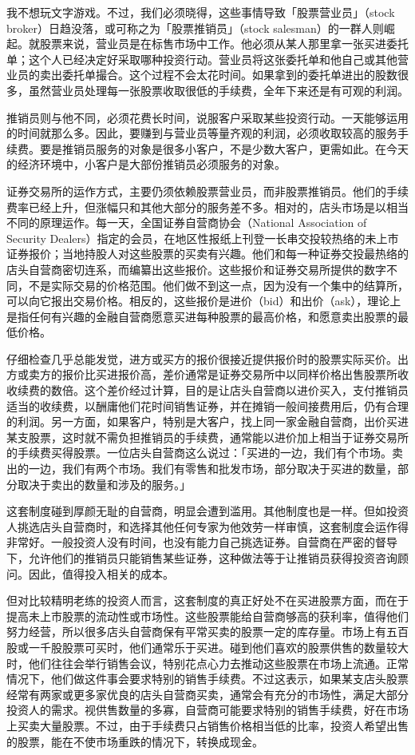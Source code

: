 \documentclass[UTF8,a4paper,zihao=-4,fontset = windows]{ctexart} %
\begin{document}
我不想玩文字游戏。不过，我们必须晓得，这些事情导致「股票营业员」（stock broker）日趋没落，或可称之为「股票推销员」（stock salesman）的一群人则崛起。就股票来说，营业员是在标售市场中工作。他必须从某人那里拿一张买进委托单；这个人已经决定好采取哪种投资行动。营业员将这张委托单和他自己或其他营业员的卖出委托单撮合。这个过程不会太花时间。如果拿到的委托单进出的股数很多，虽然营业员处理每一张股票收取很低的手续费，全年下来还是有可观的利润。

推销员则与他不同，必须花费长时间，说服客户采取某些投资行动。一天能够运用的时间就那么多。因此，要赚到与营业员等量齐观的利润，必须收取较高的服务手续费。要是推销员服务的对象是很多小客户，不是少数大客户，更需如此。在今天的经济环境中，小客户是大部份推销员必须服务的对象。

证券交易所的运作方式，主要仍须依赖股票营业员，而非股票推销员。他们的手续费率已经上升，但涨幅只和其他大部分的服务差不多。相对的，店头市场是以相当不同的原理运作。每一天，全国证券自营商协会（National Association of Security Dealers）指定的会员，在地区性报纸上刊登一长串交投较热络的未上市证券报价；当地持股人对这些股票的买卖有兴趣。他们和每一种证券交投最热络的店头自营商密切连系，而编纂出这些报价。这些报价和证券交易所提供的数字不同，不是实际交易的价格范围。他们做不到这一点，因为没有一个集中的结算所，可以向它报出交易价格。相反的，这些报价是进价（bid）和出价（ask），理论上是指任何有兴趣的金融自营商愿意买进每种股票的最高价格，和愿意卖出股票的最低价格。

仔细检查几乎总能发觉，进方或买方的报价很接近提供报价时的股票实际买价。出方或卖方的报价比买进报价高，差价通常是证券交易所中以同样价格出售股票所收收续费的数倍。这个差价经过计算，目的是让店头自营商以进价买入，支付推销员适当的收续费，以酬庸他们花时间销售证券，并在摊销一般间接费用后，仍有合理的利润。另一方面，如果客户，特别是大客户，找上同一家金融自营商，出价买进某支股票，这时就不需负担推销员的手续费，通常能以进价加上相当于证券交易所的手续费买得股票。一位店头自营商这么说过：「买进的一边，我们有个市场。卖出的一边，我们有两个市场。我们有零售和批发市场，部分取决于买进的数量，部分取决于卖出的数量和涉及的服务。」

这套制度碰到厚颜无耻的自营商，明显会遭到滥用。其他制度也是一样。但如投资人挑选店头自营商时，和选择其他任何专家为他效劳一样审慎，这套制度会运作得非常好。一般投资人没有时间，也没有能力自己挑选证券。自营商在严密的督导下，允许他们的推销员只能销售某些证券，这种做法等于让推销员获得投资咨询顾问。因此，值得投入相关的成本。

但对比较精明老练的投资人而言，这套制度的真正好处不在买进股票方面，而在于提高未上市股票的流动性或市场性。这些股票能给自营商够高的获利率，值得他们努力经营，所以很多店头自营商保有平常买卖的股票一定的库存量。市场上有五百股或一千股股票可买时，他们通常乐于买进。碰到他们喜欢的股票供售的数量较大时，他们往往会举行销售会议，特别花点心力去推动这些股票在市场上流通。正常情况下，他们做这件事会要求特别的销售手续费。不过这表示，如果某支店头股票经常有两家或更多家优良的店头自营商买卖，通常会有充分的市场性，满足大部分投资人的需求。视供售数量的多寡，自营商可能要求特别的销售手续费，好在市场上买卖大量股票。不过，由于手续费只占销售价格相当低的比率，投资人希望出售的股票，能在不使市场重跌的情况下，转换成现金。
\end{document}
